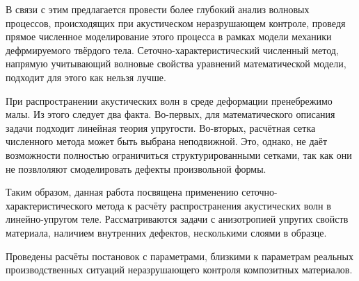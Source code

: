 В связи с этим предлагается провести более глубокий анализ волновых процессов, происходящих при акустическом неразрушающем контроле, проведя прямое численное моделирование этого процесса в рамках модели механики дефрмируемого твёрдого тела. Сеточно\hyp{}характеристический численный метод, напрямую учитывающий волновые свойства уравнений математической модели, подходит для этого как нельзя лучше.

При распространении акустических волн в среде деформации пренебрежимо малы. Из этого следует два факта. Во-первых, для математического описания задачи подходит линейная теория упругости. Во-вторых, расчётная сетка численного метода может быть выбрана неподвижной. Это, однако, не даёт возможности полностью ограничиться структурированными сетками, так как они не позвлоляют смоделировать дефекты произвольной формы.

Таким образом, данная работа посвящена применению сеточно\hyp{}характеристического метода к расчёту распространения акустических волн в линейно-упругом теле. Рассматриваются задачи с анизотропией упругих свойств материала, наличием внутренних дефектов, несколькими слоями в образце. 

Проведены расчёты постановок с параметрами, близкими к параметрам реальных производственных ситуаций неразрушающего контроля композитных материалов.